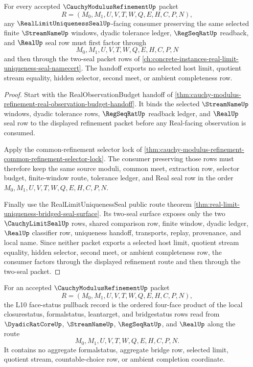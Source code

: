 \begin{theorem}
\label{thm:cauchy-modulus-refinement-real-limit-uniqueness-handoff}
For every accepted $\CauchyModulusRefinementUp$ packet
$$
R=(M_0,M_1,U,V,T,W,Q,E,H,C,P,N),
$$
any $\RealLimitUniquenessSealUp$-facing consumer preserving the same selected finite $\StreamNameUp$ windows, dyadic tolerance ledger, $\RegSeqRatUp$ readback, and $\RealUp$ seal row must first factor through
$$
M_0,M_1,U,V,T,W,Q,E,H,C,P,N
$$
and then through the two-seal packet rows of \autoref{ch:concrete-instances-real-limit-uniqueness-seal-namecert}. The handoff exports no selected host limit, quotient stream equality, hidden selector, second meet, or ambient completeness row.
\end{theorem}
\begin{proof}
Start with the RealObservationBudget handoff of \autoref{thm:cauchy-modulus-refinement-real-observation-budget-handoff}. It binds the selected $\StreamNameUp$ windows, dyadic tolerance rows, $\RegSeqRatUp$ readback ledger, and $\RealUp$ seal row to the displayed refinement packet before any Real-facing observation is consumed.

Apply the common-refinement selector lock of \autoref{thm:cauchy-modulus-refinement-common-refinement-selector-lock}. The consumer preserving those rows must therefore keep the same source moduli, common meet, extraction row, selector budget, finite-window route, tolerance ledger, and Real seal row in the order $M_0,M_1,U,V,T,W,Q,E,H,C,P,N$.

Finally use the RealLimitUniquenessSeal public route theorem \autoref{thm:real-limit-uniqueness-bridged-seal-surface}. Its two-seal surface exposes only the two $\CauchyLimitSealUp$ rows, shared comparison row, finite window, dyadic ledger, $\RealUp$ classifier row, uniqueness handoff, transports, replay, provenance, and local name. Since neither packet exports a selected host limit, quotient stream equality, hidden selector, second meet, or ambient completeness row, the consumer factors through the displayed refinement route and then through the two-seal packet.
\end{proof}

\begin{definition}
\label{def:cauchy-modulus-refinement-l10-face-status-pullback-record}
For an accepted $\CauchyModulusRefinementUp$ packet
$$
R=(M_0,M_1,U,V,T,W,Q,E,H,C,P,N),
$$
the L10 face-status pullback record is the ordered four-face product of the local closurestatus, formalstatus, leantarget, and bridgestatus rows read from $\DyadicRatCoreUp$, $\StreamNameUp$, $\RegSeqRatUp$, and $\RealUp$ along the route
$$
M_0,M_1,U,V,T,W,Q,E,H,C,P,N.
$$
It contains no aggregate formalstatus, aggregate bridge row, selected limit, quotient stream, countable-choice row, or ambient completion coordinate.
\end{definition}


